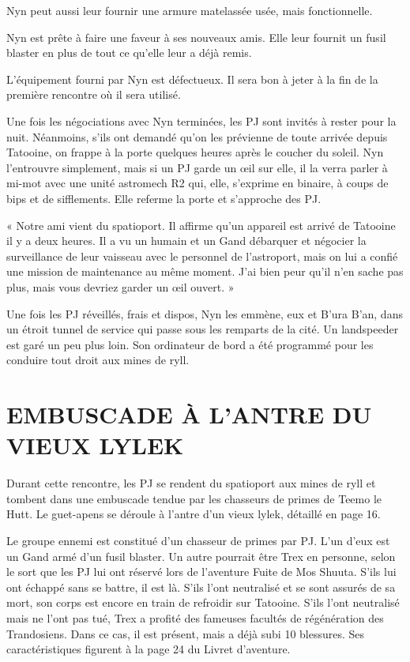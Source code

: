\documentclass[a4paper,10pt,twoside,twocolumn,openany]{book}
\begin{document}
\successA \successA Nyn peut aussi leur fournir une armure matelassée usée, mais fonctionnelle.

\triumph Nyn est prête à faire une faveur à ses nouveaux amis. Elle leur fournit un fusil blaster en plus de tout ce qu’elle leur a déjà remis.

\threat \threat L’équipement fourni par Nyn est défectueux.
Il sera bon à jeter à la fin de la première rencontre où il
sera utilisé.

\subtitle{UN MESSAGE DU SPATIOPORT}

Une fois les négociations avec Nyn terminées, les PJ sont
invités à rester pour la nuit. Néanmoins, s’ils ont demandé qu’on les prévienne de toute arrivée depuis Tatooine,
on frappe à la porte quelques heures après le coucher du
soleil. Nyn l’entrouvre simplement, mais si un PJ garde
un œil sur elle, il la verra parler à mi-mot avec une unité
astromech R2 qui, elle, s’exprime en binaire, à coups de
bips et de sifflements. Elle referme la porte et s’approche
des PJ.
\begin{quotebox}
    
« Notre ami vient du spatioport. Il affirme qu’un
appareil est arrivé de Tatooine il y a deux heures. Il
a vu un humain et un Gand débarquer et négocier
la surveillance de leur vaisseau avec le personnel
de l’astroport, mais on lui a confié une mission de
maintenance au même moment. J’ai bien peur
qu’il n’en sache pas plus, mais vous devriez garder
un œil ouvert. »
\end{quotebox}

\subtitle{AU MATIN}

Une fois les PJ réveillés, frais et dispos, Nyn les emmène,
eux et B’ura B’an, dans un étroit tunnel de service qui
passe sous les remparts de la cité. Un landspeeder est
garé un peu plus loin. Son ordinateur de bord a été programmé pour les conduire tout droit aux mines de ryll.

\section{EMBUSCADE À L’ANTRE DU VIEUX LYLEK}

Durant cette rencontre, les PJ se rendent du spatioport
aux mines de ryll et tombent dans une embuscade tendue par les chasseurs de primes de Teemo le Hutt. Le
guet-apens se déroule à l’antre d’un vieux lylek, détaillé
en page 16.

Le groupe ennemi est constitué d’un chasseur de
primes par PJ. L’un d’eux est un Gand armé d’un fusil
blaster. Un autre pourrait être Trex en personne, selon
le sort que les PJ lui ont réservé lors de l’aventure Fuite
de Mos Shuuta. S’ils lui ont échappé sans se battre, il
est là. S’ils l’ont neutralisé et se sont assurés de sa mort,
son corps est encore en train de refroidir sur Tatooine.
S’ils l’ont neutralisé mais ne l’ont pas tué, Trex a profité
des fameuses facultés de régénération des Trandosiens.
Dans ce cas, il est présent, mais a déjà subi 10 blessures.
Ses caractéristiques figurent à la page 24 du Livret
d’aventure.
\end{document}
